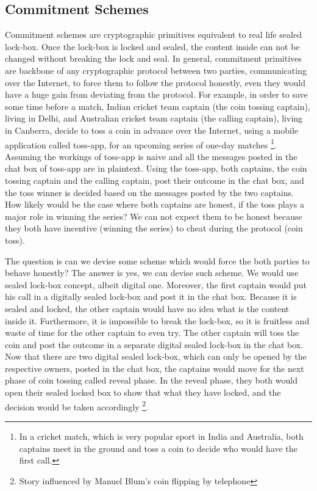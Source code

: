 {     \subsection{Commitment Schemes}   
     \label{sec:commscheme}
      Commitment schemes are cryptographic primitives equivalent to real life sealed lock-box.
      Once the lock-box is locked and sealed, the content inside  can not be changed without breaking the lock and seal. 
      In general, commitment primitives 
      are backbone of any cryptographic protocol between two parties, communicating over the Internet, to force them  to  follow the 
      protocol honestly, even they would have a huge gain from deviating 
      from the protocol. For example, in order to save some time before a match, Indian cricket team captain (the coin tossing captain), living in Delhi, and Australian cricket 
      team captain (the calling captain), living in Canberra, decide 
      to toss a coin in advance over the Internet, using a mobile application  called toss-app, for an  upcoming series of one-day matches
      \footnote{
      In a cricket match, which is very popular sport in India and Australia, both captains meet in the ground and toss a coin to 
      decide who would have the first call.}.  Assuming the workings of toss-app is naive and all the messages posted in 
      the chat box of toss-app are in plaintext.   Using the toss-app,  both captains, the coin tossing captain and the calling captain,  post their 
      outcome in the chat box,  and the toss winner is decided based on the messages posted by the two captains.  
	 How likely would be the case where both captains are honest, if the toss plays a major role in winning the series? 
	 We can not expect them to be honest because they both have incentive (winning the series) to cheat during the 
	 protocol (coin toss).      
      
      The question is can we devise some scheme which would force the both parties to behave honestly? 
      The answer is yes, we can devise such scheme.  We would use sealed lock-box concept, albeit digital one. Moreover, 
      the first captain would put his call in a digitally sealed lock-box and post it in the chat box. Because it is sealed and 
      locked, the other captain would have no idea what is the content inside it. Furthermore, it is impossible to break 
      the lock-box, so it is fruitless and waste of time for the other captain to even try. The other captain will toss the coin 
      and post the outcome in a separate digital sealed lock-box  in the chat box.  Now that there are two digital sealed lock-box, which can 
      only be opened by the respective owners,  posted in the chat box,  the captains would move for the next phase of coin tossing  called reveal phase. 
      In the reveal phase, they both would open their sealed locked box to show that what they have locked, 
      and the decision would be taken accordingly \footnote{Story influenced by Manuel Blum's coin flipping by telephone}. 
      
}
